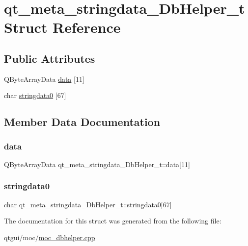 \hypertarget{structqt__meta__stringdata___db_helper__t}{}\section{qt\+\_\+meta\+\_\+stringdata\+\_\+\+Db\+Helper\+\_\+t Struct Reference}
\label{structqt__meta__stringdata___db_helper__t}
\subsection*{Public Attributes}
\begin{DoxyCompactItemize}
\item 
Q\+Byte\+Array\+Data \mbox{\hyperlink{structqt__meta__stringdata___db_helper__t_ae58f034490a9b3d78141a79c567ca815}{data}} \mbox{[}11\mbox{]}
\item 
char \mbox{\hyperlink{structqt__meta__stringdata___db_helper__t_aad1df480f4a025f1b6046a9a183e6eb2}{stringdata0}} \mbox{[}67\mbox{]}
\end{DoxyCompactItemize}


\subsection{Member Data Documentation}
\mbox{\label{structqt__meta__stringdata___db_helper__t_ae58f034490a9b3d78141a79c567ca815}} 
\subsubsection{\texorpdfstring{data}{data}}
{\footnotesize\ttfamily Q\+Byte\+Array\+Data qt\+\_\+meta\+\_\+stringdata\+\_\+\+Db\+Helper\+\_\+t\+::data\mbox{[}11\mbox{]}}

\mbox{\label{structqt__meta__stringdata___db_helper__t_aad1df480f4a025f1b6046a9a183e6eb2}} 
\subsubsection{\texorpdfstring{stringdata0}{stringdata0}}
{\footnotesize\ttfamily char qt\+\_\+meta\+\_\+stringdata\+\_\+\+Db\+Helper\+\_\+t\+::stringdata0\mbox{[}67\mbox{]}}



The documentation for this struct was generated from the following file\+:\begin{DoxyCompactItemize}
\item 
qtgui/moc/\mbox{\hyperlink{moc__dbhelper_8cpp}{moc\+\_\+dbhelper.\+cpp}}\end{DoxyCompactItemize}
